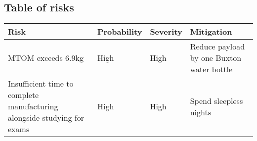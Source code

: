 \vspace*{1cm}
\subsection{Table of risks}

\begin{table}[h]
\centering
\begin{tabularx}{\textwidth}{p{}|X|X|p{}} 
	\textbf{Risk} & \textbf{Probability} & \textbf{Severity} & \textbf{Mitigation} \\ \hline
	MTOM exceeds 6.9kg & High & High & Reduce payload by one Buxton water bottle \\ \hline
	Insufficient time to complete manufacturing alongside studying for exams & High & High & Spend sleepless nights \\ 
\end{tabularx}
\end{table}

